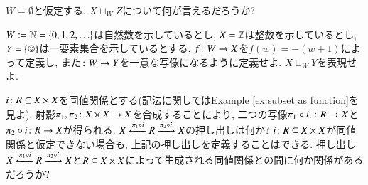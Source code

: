 \begin{exercise}
$W=\emptyset$と仮定する. $X\sqcup_WZ$について何が言えるだろうか?
\end{exercise}

\begin{exercise}
$W:=\NN=\{0,1,2,\ldots\}$は自然数を示しているとし, $X=\ZZ$は整数を示しているとし, $Y=\singleton$は一要素集合を示しているとする. $f\taking W\to X$を$f(w)= -(w+1)$によって定義し, また$\taking W\to Y$を一意な写像になるように定義せよ. $X\sqcup_WY$を表現せよ.
\end{exercise}

\begin{exercise}
$i\taking R\ss X\times X$を同値関係とする(記法に関してはExample \ref{ex:subset as function}を見よ). 射影$\pi_1,\pi_2\taking X\times X\to X$を合成することにより, 二つの写像$\pi_1\circ i,\taking R\to X$と$\pi_2\circ i\taking R\to X$が得られる.
\sexc $X\From{\pi_1\circ i}R\To{\pi_2\circ i}X$の押し出しは何か?
\next $i\taking R\ss X\times X$が同値関係と仮定できない場合も, 上記の押し出しを定義することはできる. 押し出し$X\From{\pi_1\circ i}R\To{\pi_2\circ i}X$と$R\ss X\times X$によって生成される同値関係との間に何か関係があるだろうか?
\endsexc
\end{exercise}


